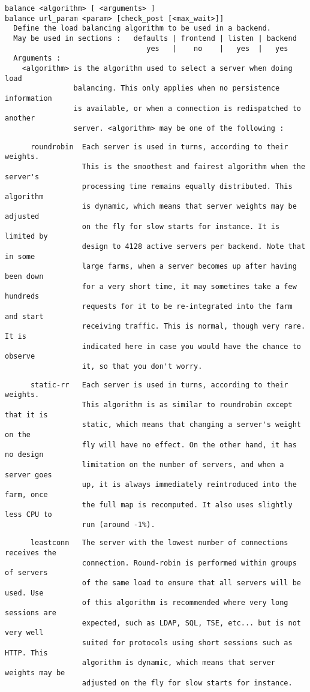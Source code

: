 \begin{verbatim}
balance <algorithm> [ <arguments> ]
balance url_param <param> [check_post [<max_wait>]]
  Define the load balancing algorithm to be used in a backend.
  May be used in sections :   defaults | frontend | listen | backend
                                 yes   |    no    |   yes  |   yes
  Arguments :
    <algorithm> is the algorithm used to select a server when doing load
                balancing. This only applies when no persistence information
                is available, or when a connection is redispatched to another
                server. <algorithm> may be one of the following :
\end{verbatim}

\begin{verbatim}
      roundrobin  Each server is used in turns, according to their weights.
                  This is the smoothest and fairest algorithm when the server's
                  processing time remains equally distributed. This algorithm
                  is dynamic, which means that server weights may be adjusted
                  on the fly for slow starts for instance. It is limited by
                  design to 4128 active servers per backend. Note that in some
                  large farms, when a server becomes up after having been down
                  for a very short time, it may sometimes take a few hundreds
                  requests for it to be re-integrated into the farm and start
                  receiving traffic. This is normal, though very rare. It is
                  indicated here in case you would have the chance to observe
                  it, so that you don't worry.
\end{verbatim}

\begin{verbatim}
      static-rr   Each server is used in turns, according to their weights.
                  This algorithm is as similar to roundrobin except that it is
                  static, which means that changing a server's weight on the
                  fly will have no effect. On the other hand, it has no design
                  limitation on the number of servers, and when a server goes
                  up, it is always immediately reintroduced into the farm, once
                  the full map is recomputed. It also uses slightly less CPU to
                  run (around -1%).
\end{verbatim}

\begin{verbatim}
      leastconn   The server with the lowest number of connections receives the
                  connection. Round-robin is performed within groups of servers
                  of the same load to ensure that all servers will be used. Use
                  of this algorithm is recommended where very long sessions are
                  expected, such as LDAP, SQL, TSE, etc... but is not very well
                  suited for protocols using short sessions such as HTTP. This
                  algorithm is dynamic, which means that server weights may be
                  adjusted on the fly for slow starts for instance.
\end{verbatim}

